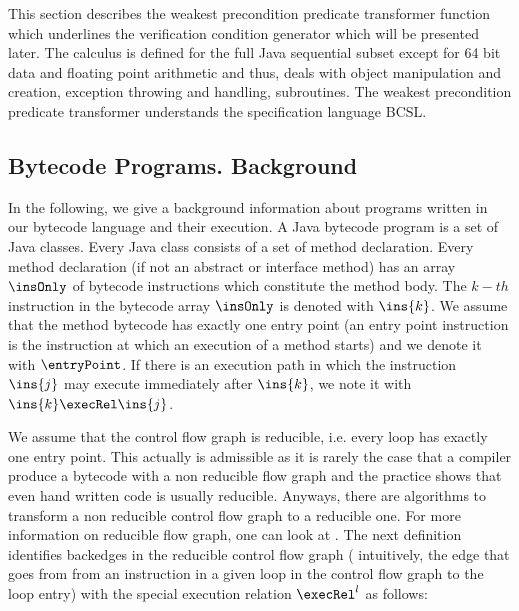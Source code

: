 
This section describes the weakest precondition predicate transformer function which underlines the verification condition generator which will be presented later. 
The calculus is defined for the full Java sequential subset except for 64 bit data and floating point arithmetic and thus, deals with  object manipulation and creation,
 exception throwing and handling, subroutines. The weakest precondition predicate transformer understands the specification language BCSL. 
 

\subsection{Bytecode Programs. Background}\label{prelim}


In the following, we give a background information about programs written in our bytecode language and their  execution.
A Java bytecode program is a set of Java classes. Every Java class consists of a set of method declaration. 
Every method declaration (if not an abstract or interface method) 
has an array $\insOnly$ of bytecode instructions which constitute the method body.
The $k-th$ instruction in the bytecode array $\insOnly$ is  denoted with $\ins{k}$.
 We assume that the method bytecode has exactly one entry point
 (an entry point instruction is the instruction at which an execution of a method starts)
 and we denote it with $\entryPoint$.   If there is an execution path in which the instruction
 $\ins{j}$ may execute immediately after $\ins{k}$, we note it with $ \ins{k} \execRel \ins{j}$.

We assume that the control flow graph is reducible, i.e. every loop has exactly one entry point. This actually is admissible
as it is rarely the case that a compiler produce a bytecode with a non reducible flow graph and the practice shows that even hand written
code is usually reducible. Anyways, there are algorithms to transform a non reducible control flow graph to a reducible one. 
For more information on reducible flow graph, one can look at \cite{ARUCom1986}.
The next definition identifies backedges in the reducible control flow graph ( intuitively,  the edge that goes from 
from an instruction in a given loop in the control flow graph to the loop entry)  with the special execution relation $\execRel^l$ as follows:
 

